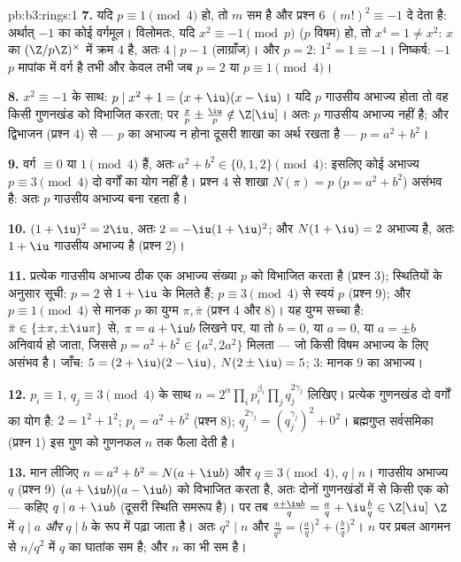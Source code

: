 \begin{solution}{pb:b3:rings:1}
\textbf{7.} यदि $p \equiv 1 \pmod 4$ हो, तो $m$ सम है और प्रश्न 6 $(m!)^2 \equiv -1$ दे देता
है: अर्थात् $-1$ का कोई वर्गमूल। विलोमतः, यदि $x^2 \equiv -1 \pmod p$ ($p$ विषम)
हो, तो $x^4 = 1 \neq x^2$: $x$ का $(\Z/p\Z)^\times$ में क्रम $4$ है, अतः $4 \mid p - 1$ (लाग्राँज)।
और $p = 2$: $1^2 = 1 \equiv -1$। निष्कर्ष: $-1$ $p$ मापांक में वर्ग है तभी और
केवल तभी जब $p = 2$ या $p \equiv 1 \pmod 4$।

\textbf{8.} $x^2 \equiv -1$ के साथ: $p \mid x^2 + 1 = (x + \iu)(x -
\iu)$। यदि $p$ गाउसीय अभाज्य होता तो वह
किसी गुणनखंड को विभाजित करता; पर $\frac xp \pm \frac \iu p \notin \Z[\iu]$। अतः $p$ गाउसीय अभाज्य नहीं
है; और द्विभाजन (प्रश्न 4) से --- $p$ का अभाज्य न होना दूसरी शाखा
का अर्थ रखता है --- $p = a^2 + b^2$।

\textbf{9.} वर्ग $\equiv 0$ या $1 \pmod 4$ हैं, अतः $a^2 + b^2
\in \{0, 1, 2\} \pmod 4$: इसलिए कोई अभाज्य
$p \equiv 3 \pmod 4$ दो वर्गों का योग नहीं है। प्रश्न 4 से शाखा $N(\pi) = p$ ($p =
a^2+b^2$) असंभव
है: अतः $p$ गाउसीय अभाज्य बना रहता है।

\textbf{10.} $(1 + \iu)^2 = 2\iu$, अतः $2 = -\iu(1 + \iu)^2$; और $N(1 + \iu) = 2$ अभाज्य है, अतः $1 + \iu$ गाउसीय
अभाज्य है (प्रश्न 2)।

\textbf{11.} प्रत्येक गाउसीय अभाज्य ठीक एक अभाज्य संख्या $p$ को
विभाजित करता है (प्रश्न 3); स्थितियों के अनुसार सूची: $p = 2$ से $1 + \iu$
के  मिलते हैं; $p \equiv 3 \pmod 4$ से स्वयं $p$ (प्रश्न 9); और $p \equiv 1 \pmod 4$ से
मानक $p$ का युग्म $\pi, \bar\pi$ (प्रश्न 4 और 8)। यह युग्म सच्चा है: $\bar\pi \in
\{\pm\pi, \pm\iu\pi\}$
से, $\pi = a + \iu b$ लिखने पर, या तो $b = 0$, या $a = 0$, या $a = \pm b$ अनिवार्य हो
जाता, जिससे $p = a^2 + b^2 \in
\{a^2, 2a^2\}$ मिलता --- जो किसी विषम अभाज्य के लिए असंभव है।
जाँच: $5 = (2 + \iu)(2 - \iu)$, $N(2\pm\iu) = 5$; $3$: मानक $9$ का अभाज्य।

\textbf{12.} $p_i \equiv 1$, $q_j \equiv 3 \pmod 4$ के साथ $n = 2^{\alpha}\prod_i p_i^{\beta_i} \prod_j
q_j^{2\gamma_j}$ लिखिए। प्रत्येक गुणनखंड दो
वर्गों का योग है: $2 = 1^2 + 1^2$; $p_i = a^2
+ b^2$ (प्रश्न 8); $q_j^{2\gamma_j} = (q_j^{\gamma_j})^2 +
0^2$। ब्रह्मगुप्त
सर्वसमिका (प्रश्न 1) इस गुण को गुणनफल $n$ तक फैला देती है।

\textbf{13.} मान लीजिए $n = a^2 + b^2 = N(a + \iu b)$ और $q \equiv 3
\pmod 4$, $q \mid n$। गाउसीय अभाज्य $q$
(प्रश्न 9) $(a + \iu b)(a - \iu b)$ को विभाजित करता है, अतः दोनों गुणनखंडों में से किसी
एक को --- कहिए $q
\mid a + \iu b$ (दूसरी स्थिति समरूप है)। पर तब $\frac{a +
\iu b}{q} = \frac aq + \iu \frac bq \in \Z[\iu]$ $\Z$ में
$q
\mid a$ \emph{और} $q \mid b$ के रूप में पढ़ा जाता है। अतः $q^2 \mid n$ और $\frac n{q^2} =
\bigl(\frac aq\bigr)^2 + \bigl(\frac bq\bigr)^2$।
$n$ पर प्रबल आगमन से $n/q^2$ में $q$ का घातांक सम है; और $n$
का भी सम है।


\end{solution}
